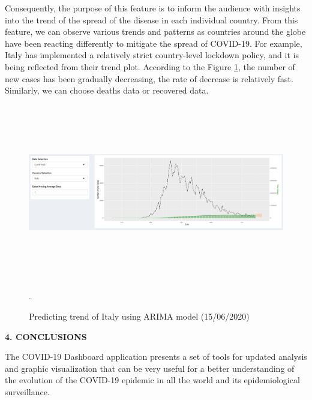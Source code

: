 \documentclass[12pt, a4paper,oneside]{book}
\theoremstyle{definition}
\begin{document}
Consequently, the purpose of this feature is to inform the audience with insights into the trend of the spread of the disease in each individual country. From this feature, we can observe various trends and patterns as countries around the globe have been reacting differently to mitigate the spread of COVID-19. For example,  Italy has implemented a relatively strict country-level lockdown policy, and it is being reflected from their trend plot. According to the Figure \ref{D3}, the number of new cases has been gradually decreasing, the rate of decrease is relatively fast. Similarly, we can choose deaths data or recovered data.
\begin{figure}[!htb]
	\centering
	\includegraphics[width=1\linewidth,height=7.7cm]{anh/D3}
	\vskip-4mm 
	\caption{Predicting trend of Italy using ARIMA model (15/06/2020)}.  
	\label{D3}
\end{figure}
\vskip 0.3cm
\noindent 
{\bf 4. CONCLUSIONS}

The COVID-19 Dashboard application presents a set of tools for updated analysis and graphic visualization that can be very useful for a better understanding of the evolution of the COVID-19 epidemic in all the world and its epidemiological surveillance.
\end{document}
